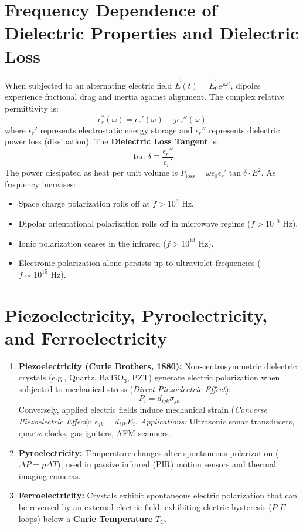 \section{Frequency Dependence of Dielectric Properties and Dielectric Loss}
When subjected to an alternating electric field $\vec{E}(t) = \vec{E}_0 e^{j\omega t}$, dipoles experience frictional drag and inertia against alignment. The complex relative permittivity is:
\begin{equation}
\epsilon_r^*(\omega) = \epsilon_r'(\omega) - j\epsilon_r''(\omega)
\end{equation}
where $\epsilon_r'$ represents electrostatic energy storage and $\epsilon_r''$ represents dielectric power loss (dissipation). The \textbf{Dielectric Loss Tangent} is:
\begin{equation}
\tan\delta \equiv \frac{\epsilon_r''}{\epsilon_r'}
\end{equation}
The power dissipated as heat per unit volume is $P_{\text{loss}} = \omega \epsilon_0 \epsilon_r' \tan\delta \cdot E^2$.
As frequency increases:
\begin{itemize}[itemsep=1pt]
    \item Space charge polarization rolls off at $f > 10^3\text{ Hz}$.
    \item Dipolar orientational polarization rolls off in microwave regime ($f > 10^{10}\text{ Hz}$).
    \item Ionic polarization ceases in the infrared ($f > 10^{13}\text{ Hz}$).
    \item Electronic polarization alone persists up to ultraviolet frequencies ($f \sim 10^{15}\text{ Hz}$).
\end{itemize}

\section{Piezoelectricity, Pyroelectricity, and Ferroelectricity}
\begin{enumerate}[leftmargin=*,itemsep=3pt]
    \item \textbf{Piezoelectricity (Curie Brothers, 1880):} Non-centrosymmetric dielectric crystals (e.g., Quartz, $\text{BaTiO}_3$, PZT) generate electric polarization when subjected to mechanical stress (\textit{Direct Piezoelectric Effect}):
    \begin{equation}
    P_i = d_{ijk} \sigma_{jk}
    \end{equation}
    Conversely, applied electric fields induce mechanical strain (\textit{Converse Piezoelectric Effect}): $\epsilon_{jk} = d_{ijk} E_i$.
    \textit{Applications:} Ultrasonic sonar transducers, quartz clocks, gas igniters, AFM scanners.
    \item \textbf{Pyroelectricity:} Temperature changes alter spontaneous polarization ($\Delta P = p \Delta T$), used in passive infrared (PIR) motion sensors and thermal imaging cameras.
    \item \textbf{Ferroelectricity:} Crystals exhibit spontaneous electric polarization that can be reversed by an external electric field, exhibiting electric hysteresis ($P$-$E$ loops) below a \textbf{Curie Temperature} $T_C$.
\end{enumerate}

